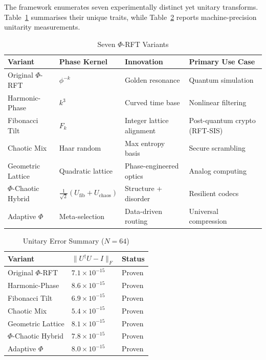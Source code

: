 \documentclass[11pt,a4paper]{article}
\begin{document}
The framework enumerates seven experimentally distinct yet unitary transforms. Table~\ref{tab:variants} summarises their unique traits, while Table~\ref{tab:unitary-errors} reports machine-precision unitarity measurements.

\begin{table}[H]
\centering
\caption{Seven $\Phi$-RFT Variants}
\label{tab:variants}
\begin{tabular}{@{}llll@{}}
\toprule
Variant & Phase Kernel & Innovation & Primary Use Case \\ \midrule
Original $\Phi$-RFT & $\phi^{-k}$ & Golden resonance & Quantum simulation \\
Harmonic-Phase & $k^3$ & Curved time base & Nonlinear filtering \\
Fibonacci Tilt & $F_k$ & Integer lattice alignment & Post-quantum crypto (RFT-SIS) \\
Chaotic Mix & Haar random & Max entropy basis & Secure scrambling \\
Geometric Lattice & Quadratic lattice & Phase-engineered optics & Analog computing \\
$\Phi$-Chaotic Hybrid & $\frac{1}{\sqrt{2}}(U_{\text{fib}}+U_{\text{chaos}})$ & Structure + disorder & Resilient codecs \\
Adaptive $\Phi$ & Meta-selection & Data-driven routing & Universal compression \\ \bottomrule
\end{tabular}
\end{table}

\begin{table}[H]
\centering
\caption{Unitary Error Summary ($N=64$)}
\label{tab:unitary-errors}
\begin{tabular}{@{}lll@{}}
\toprule
Variant & $\|U^\dagger U - I\|_F$ & Status \\ \midrule
Original $\Phi$-RFT & $7.1 \times 10^{-15}$ & Proven \\
Harmonic-Phase & $8.6 \times 10^{-15}$ & Proven \\
Fibonacci Tilt & $6.9 \times 10^{-15}$ & Proven \\
Chaotic Mix & $5.4 \times 10^{-15}$ & Proven \\
Geometric Lattice & $8.1 \times 10^{-15}$ & Proven \\
$\Phi$-Chaotic Hybrid & $7.8 \times 10^{-15}$ & Proven \\
Adaptive $\Phi$ & $8.0 \times 10^{-15}$ & Proven \\ \bottomrule
\end{tabular}
\end{table}
\end{document}
